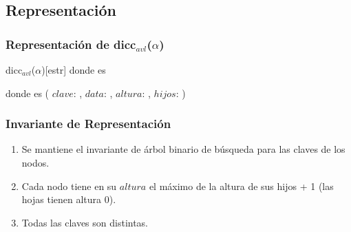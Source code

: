 




\subsection{Representación}

	\subsubsection{Representación de dicc$_{avl}$($\alpha$)}

	\begin{Estructura}{dicc$_{avl}$($\alpha$)}[estr]
		\- \- \- \- donde  es 

		\- \- \- \- donde  es
			(
				$clave$: ,
				$data$: \TipoVariable{$\alpha$},
				$altura$: ,
				$hijos$: 
			)
	\end{Estructura}



	\subsubsection{Invariante de Representación}
	  \begin{enumerate}
		\item{Se mantiene el invariante de árbol binario de búsqueda para las claves de los nodos.}
		\item{Cada nodo tiene en su $altura$ el máximo de la altura de sus hijos + 1 (las hojas tienen altura 0).}
		\item{Todas las claves son distintas.}
	  \end{enumerate}


